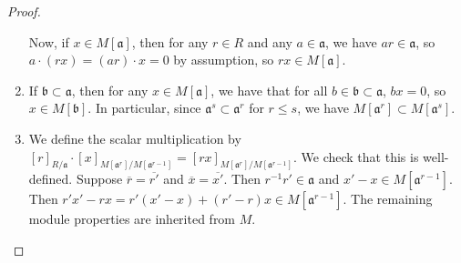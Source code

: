 \documentclass[reqno]{amsart}
\theoremstyle{definition}
\theoremstyle{remark}
\begin{document}
\begin{proof}
\begin{enumerate}
                Now, if $x \in M \left[ \mathfrak{a} \right] $,
                then
                for any $r \in R$ and any
                $a \in \mathfrak{a}$, we have
                $ar \in \mathfrak{a}$, so
                $a \cdot \left( rx \right) 
                = \left( ar \right) \cdot x
                = 0$ by assumption, so
                $rx \in M \left[ \mathfrak{a} \right] $.
            \item If $\mathfrak{b} \subset \mathfrak{a}$, then
                for any
                $x \in M\left[ \mathfrak{a} \right] $, we have
                that for all $b \in \mathfrak{b} \subset 
                \mathfrak{a}$,
                $bx = 0$, so
                $x \in M \left[ \mathfrak{b} \right] $.
                In particular, since
                $\mathfrak{a}^{s} \subset 
                \mathfrak{a}^{r}$ for $r \le s$,
                we have
                $M \left[ \mathfrak{a}^{r} \right] 
                \subset M\left[ \mathfrak{a}^{s} \right] $.
            \item We define the
                scalar multiplication by
                $\left[ r \right]_{R / \mathfrak{a}}
                \cdot \left[ x \right]_{M \left[ \mathfrak{a}^{r} \right] 
                / M\left[ \mathfrak{a}^{r-1} \right] }
                = \left[ rx \right]_{
                M\left[ \mathfrak{a}^{r} \right] 
            / M\left[ \mathfrak{a}^{r-1} \right] }$.
            We check that this is well-defined.
            Suppose
            $\overline{r} = \overline{r'}$ and
            $\overline{x } = \overline{x'}$. Then
            $r^{-1} r' \in \mathfrak{a}$ and
            $x' - x  \in M\left[ \mathfrak{a}^{r-1} \right] $.
            Then
            $r'x' - rx 
            = r' \left( x'-x \right) +
            \left( r'-r \right) x
            \in M \left[ \mathfrak{a}^{r-1} \right] $.
            The remaining module properties are inherited
            from $M$.


\end{enumerate}
\end{proof}
\end{document}
